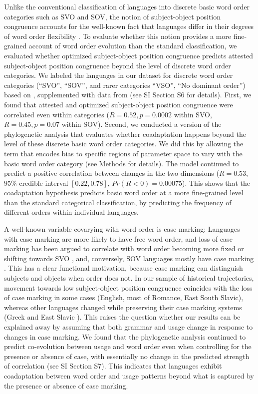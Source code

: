 \documentclass[11pt,a4paper]{article}
\begin{document}
Unlike the conventional classification of languages into discrete basic word order categories such as SVO and SOV, the notion of subject-object position congruence accounts for the well-known fact that languages differ in their degrees of word order flexibility \citep{steele1978word}.
To evaluate whether this notion provides a more fine-grained account of word order evolution than the standard classification, we evaluated whether optimized subject-object position congruence predicts attested subject-object position congruence beyond the level of discrete word order categories.
We labeled the languages in our dataset for discrete word order categories (``SVO'', ``SOV'', and rarer categories ``VSO'', ``No dominant order'') based on \citet{wals-81}, supplemented with data from \citet{gell-mann-origin-2011} (see SI Section S6 for details).
First, we found that attested and optimized subject-object position congruence were correlated even within categories ($R = 0.52, p = 0.0002$ within SVO, $R=0.45, p=0.07$ within SOV). 
Second, we conducted a version of the phylogenetic analysis that evaluates whether coadaptation happens beyond the level of these discrete basic word order categories.
We did this by allowing the term that encodes bias to specific regions of parameter space to vary with the basic word order category  (see Methods for details).
The model continued to predict a positive correlation between changes in the two dimensions ($R=0.53$, $95\%$ credible interval $[0.22, 0.78]$, $Pr(R < 0) = 0.00075$).
This shows that the coadaptation hypothesis predicts basic word order at a more fine-grained level than the standard categorical classification, by predicting the frequency of different orders within individual languages.


A well-known variable covarying with word order is case marking: Languages with case marking are more likely to have free word order, and loss of case marking has been argued to correlate with word order becoming more fixed or shifting towards SVO \citep{vennemann1974explanation}, and, conversely, SOV languages mostly have case marking \citep[Universal 41]{greenberg-universals-1963}.
This has a clear functional motivation, because case marking can distinguish subjects and objects when order does not.
In our sample of historical trajectories, movement towards low subject-object position congruence coincides with the loss of case marking in some cases (English, most of Romance, East South Slavic), whereas other languages changed while preserving their case marking systems (Greek \citep{taylor1994change} and East Slavic \citep[p. 242--4]{matthews1960russian}).
This raises the question whether our results can be explained away by assuming that both grammar and usage change in response to changes in case marking.
We found that the phylogenetic analysis continued to predict co-evolution between usage and word order even when controlling for the presence or absence of case, with essentially no change in the predicted strength of correlation (see SI Section S7).
This indicates that languages exhibit coadaptation between word order and usage patterns beyond what is captured by the presence or absence of case marking.
\end{document}
